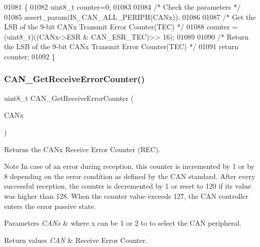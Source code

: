 \begin{DoxyCode}
01081 \{
01082   uint8\_t counter=0;
01083   
01084   \textcolor{comment}{/* Check the parameters */}
01085   assert_param(IS_CAN_ALL_PERIPH(CANx));
01086   
01087   \textcolor{comment}{/* Get the LSB of the 9-bit CANx Transmit Error Counter(TEC) */}
01088   counter = (uint8\_t)((CANx->ESR & CAN_ESR_TEC)>> 16);
01089   
01090   \textcolor{comment}{/* Return the LSB of the 9-bit CANx Transmit Error Counter(TEC) */}
01091   \textcolor{keywordflow}{return} counter;
01092 \}
\end{DoxyCode}
\mbox{\label{group__CAN__Group5_ga6903eecbec40eb1361d915ddde9a3274}} 
\subsubsection{C\+A\+N\+\_\+\+Get\+Receive\+Error\+Counter()}
{\footnotesize\ttfamily uint8\+\_\+t C\+A\+N\+\_\+\+Get\+Receive\+Error\+Counter (\begin{DoxyParamCaption}\item[{\textbf{ C\+A\+N\+\_\+\+Type\+Def} $\ast$}]{C\+A\+Nx }\end{DoxyParamCaption})}



Returns the C\+A\+Nx Receive Error Counter (R\+EC). 

\begin{DoxyNote}{Note}
In case of an error during reception, this counter is incremented by 1 or by 8 depending on the error condition as defined by the C\+AN standard. After every successful reception, the counter is decremented by 1 or reset to 120 if its value was higher than 128. When the counter value exceeds 127, the C\+AN controller enters the error passive state. 
\end{DoxyNote}

\begin{DoxyParams}{Parameters}
{\em C\+A\+Nx} & where x can be 1 or 2 to to select the C\+AN peripheral. \\
\hline
\end{DoxyParams}

\begin{DoxyRetVals}{Return values}
{\em C\+AN} & Receive Error Counter. \\
\hline
\end{DoxyRetVals}


